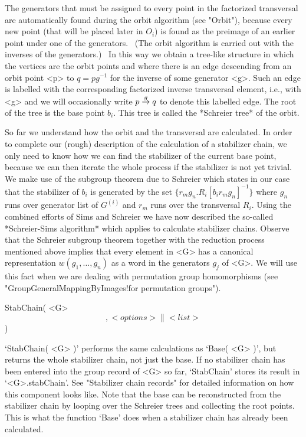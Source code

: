 The generators that  must be assigned  to every  point in the  factorized
transversal are  automatically  found  during the   orbit algorithm  (see
"Orbit"), because every new point (that will be placed later in $O_i$) is
found as the preimage of an earlier point under  one of the generators. \
(The orbit algorithm is carried out with the inverses of the generators.)
\ In this way we obtain  a tree-like structure in  which the vertices are
the  orbit points and where  there  is an edge  descending  from an orbit
point <p> to  $q=pg^{-1}$ for the inverse of  some generator <g>. Such an
edge is labelled with   the corresponding factorized inverse  transversal
element, i.e., with <g> and we will occasionally write $p\labelto g q$ to
denote this labelled edge. The root of the  tree is the base point $b_i$.
This tree is called the *Schreier tree* of the orbit.

So far we understand how the orbit and the transversal are calculated. In
order  to  complete  our  (rough) description  of  the  calculation  of a
stabilizer chain, we only need to know how  we can find the stabilizer of
the current base point, because we can then  iterate the whole process if
the  stabilizer is not yet trivial.  We make use  of the subgroup theorem
due to Schreier which states in our case that  the stabilizer of $b_i$ is
generated by the set $\{  r_mg_n.  R_i[b_i{r_mg_n}]^{-1} \}$ where  $g_n$
runs over generator list of $G^{(i)}$ and $r_m$ runs over the transversal
$R_i$.  Using   the combined efforts of   Sims  and Schreier we  have now
described the so-called *Schreier-Sims algorithm* which {\GAP} applies to
calculate stabilizer chains. Observe  that the Schreier subgroup  theorem
together with the reduction   process mentioned above implies that  every
element in <G> has a canonical representation $w(g_1,  \ldots, g_n)$ as a
word in the  generators $g_j$ of <G>.  We will use  this fact when we are
dealing    with          permutation    group       homomorphisms    (see
"GroupGeneralMappingByImages!for permutation groups").

\>StabChain( <G> \[, <options> \| <list> \] )

`StabChain( <G> )' performs the  same calculations as  `Base( <G> )', but
returns the whole stabilizer  chain, not just  the base. If no stabilizer
chain has been entered  into the group  record of <G> so far, `StabChain'
stores its result in  `<G>.stabChain'. See "Stabilizer chain records" for
detailed information on how this component looks like. Note that the base
can   be reconstructed  from  the  stabilizer chain by  looping  over the
Schreier trees and collecting the root points. This  is what the function
`Base' does when a stabilizer chain has already been calculated.

